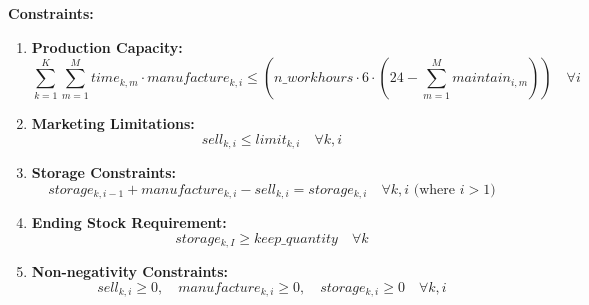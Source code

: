 \documentclass{article}
\begin{document}
\textbf{Constraints:}
\begin{enumerate}
    \item \textbf{Production Capacity:}
    \[
    \sum_{k=1}^{K} \sum_{m=1}^{M} time_{k,m} \cdot manufacture_{k,i} \leq \left( n\_workhours \cdot 6 \cdot (24 - \sum_{m=1}^{M} maintain_{i,m}) \right) \quad \forall i
    \]
    
    \item \textbf{Marketing Limitations:}
    \[
    sell_{k,i} \leq limit_{k,i} \quad \forall k, i
    \]
    
    \item \textbf{Storage Constraints:}
    \[
    storage_{k,i-1} + manufacture_{k,i} - sell_{k,i} = storage_{k,i} \quad \forall k, i \text{ (where } i>1\text{)}
    \]
    
    \item \textbf{Ending Stock Requirement:}
    \[
    storage_{k,I} \geq keep\_quantity \quad \forall k
    \]

    \item \textbf{Non-negativity Constraints:}
    \[
    sell_{k,i} \geq 0, \quad manufacture_{k,i} \geq 0, \quad storage_{k,i} \geq 0 \quad \forall k, i
    \]
\end{enumerate}
\end{document}
